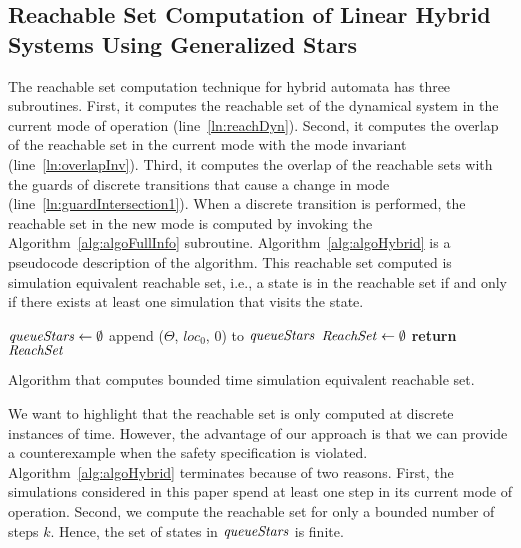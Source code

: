 \subsection{Reachable Set Computation of Linear Hybrid Systems Using Generalized Stars}
%
The reachable set computation technique for hybrid automata has three subroutines.
%
First, it computes the reachable set of the dynamical system in the current mode of operation (line~\ref{ln:reachDyn}).
%
Second, it computes the overlap of the reachable set in the current mode with the mode invariant (line~\ref{ln:overlapInv}).
%
Third, it computes the overlap of the reachable sets with the guards of discrete transitions that cause a change in mode (line~\ref{ln:guardIntersection1}).
%
When a discrete transition is performed, the reachable set in the new mode is computed by invoking the Algorithm~\ref{alg:algoFullInfo} subroutine.
%
Algorithm~\ref{alg:algoHybrid} is a pseudocode description of the algorithm. This reachable set computed is simulation equivalent reachable set, i.e., a state is in the reachable set if and only if there exists at least one simulation that visits the state.

\vspace{-0.4cm}
\begin{algorithm}[h!]
\SetAlgoVlined
{}
${\it queueStars} \gets \emptyset$\; 
append ($\Theta$, $loc_0$, $0$) to ${\it queueStars}$\; 
${\it ReachSet} \gets \emptyset$\;
{\bf return} ${\it ReachSet}$\;
\caption{Algorithm that computes bounded time simulation equivalent reachable set.}
\label{alg:algoHybrid}
\end{algorithm}
\vspace{-0.4cm}

We want to highlight that the reachable set is only computed at discrete instances of time.
%
However, the advantage of our approach is that we can provide a counterexample when the safety specification is violated.
%
Algorithm~\ref{alg:algoHybrid} terminates because of two reasons. First, the simulations considered in this paper spend at least one step in its current mode of operation. Second, we compute the reachable set for only a bounded number of steps $k$. Hence, the set of states in ${\it queueStars}$ is finite.

